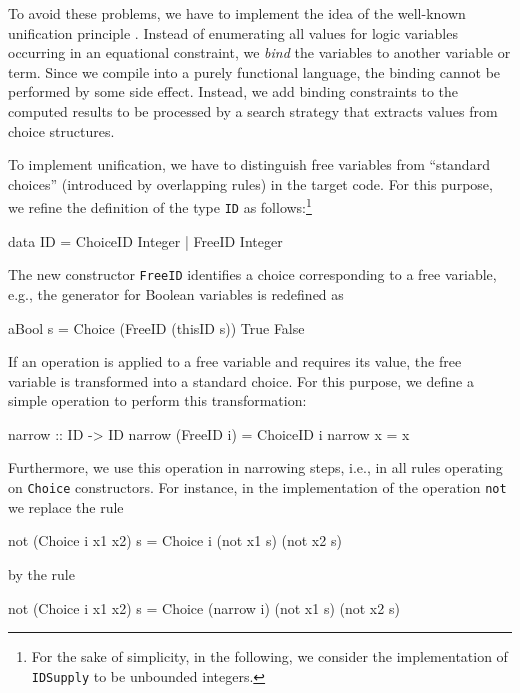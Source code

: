 \documentclass{llncs}
\newcommand{\code}[1]{\mbox{\small\texttt{#1}}}
\begin{document}
To avoid these problems, we have to implement the idea
of the well-known unification principle \cite{Robinson65}.
Instead of enumerating all values for logic variables
occurring in an equational constraint,
we \emph{bind} the variables to another variable or term.
Since we compile into a purely functional language,
the binding cannot be performed by some side effect.
Instead, we add binding constraints to the computed results to be 
processed by a search strategy that extracts values from choice structures.

To implement unification, we have to distinguish free variables
from ``standard choices'' (introduced by overlapping rules)
in the target code. For this purpose, we refine the definition
of the type \code{ID} as follows:\footnote{For the sake
of simplicity, in the following, we consider the
implementation of \code{IDSupply} to be unbounded integers.}
\begin{haskell}
  data ID = ChoiceID Integer | FreeID Integer
\end{haskell}
The new constructor \code{FreeID} identifies a choice corresponding to
a free variable, e.g., the generator for Boolean variables is
redefined as
\begin{haskell}
  aBool s = Choice (FreeID (thisID s)) True False
\end{haskell}
%
If an operation is applied to a free variable and requires its value,
the free variable is transformed into a standard choice.
For this purpose, we define a simple operation to perform
this transformation:
\begin{haskell}
  narrow :: ID -> ID
  narrow (FreeID i) = ChoiceID i
  narrow x          = x
\end{haskell}
Furthermore, we use this operation in narrowing steps,
i.e., in all rules operating on \code{Choice} constructors.
For instance, in the implementation of the operation \code{not}
we replace the rule
\begin{haskell}
  not (Choice i x1 x2) s = Choice i (not x1 s) (not x2 s)
\end{haskell}
by the rule
\begin{haskell}
  not (Choice i x1 x2) s = Choice (narrow i) (not x1 s) (not x2 s)
\end{haskell}
\end{document}
